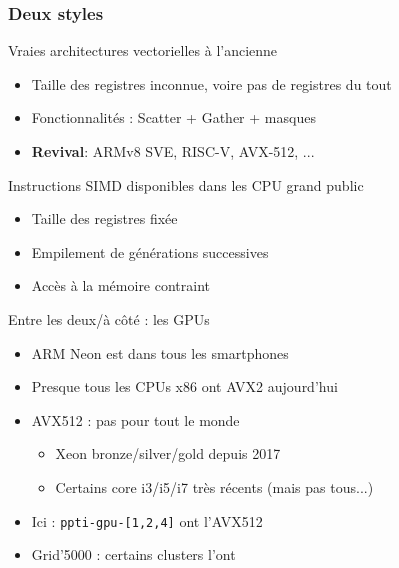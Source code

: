 \documentclass[xcolor={x11names,svgnames}]{beamer}
\begin{document}

\begin{frame}
  \frametitle{Deux styles}

\begin{exampleblock}{\og Vraies\fg{} architectures vectorielles à l'ancienne}
  \begin{itemize}
  \item Taille des registres inconnue, voire pas de registres du tout
  \item Fonctionnalités : Scatter + Gather + masques
  \item \textbf{\alert{Revival}}: ARMv8 SVE, RISC-V, AVX-512, ...
  \end{itemize}
\end{exampleblock}

\begin{alertblock}{Instructions SIMD disponibles dans les CPU grand public}
  \begin{itemize}
  \item Taille des registres fixée
  \item Empilement de générations successives
  \item Accès à la mémoire contraint
  \end{itemize}
\end{alertblock}

Entre les deux/à côté : les GPUs
\end{frame}


\begin{frame}
  \begin{itemize}
  \item ARM Neon est dans tous les smartphones

    \medskip
    
    \item Presque tous les CPUs x86 ont AVX2 aujourd'hui

      \medskip

    \item AVX512 : pas pour tout le monde
      \begin{itemize}
      \item Xeon bronze/silver/gold depuis 2017
      \item Certains core i3/i5/i7 très récents (mais pas tous...) 
      \end{itemize}
    

    \medskip

  \item Ici : \texttt{ppti-gpu-[1,2,4]} ont l'AVX512
  \item Grid'5000 : certains clusters l'ont
  \end{itemize}
\end{frame}
\end{document}
